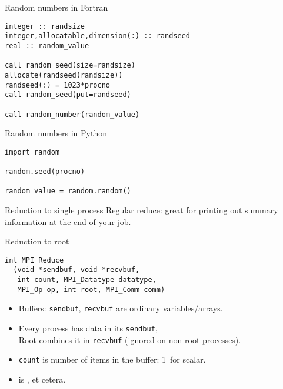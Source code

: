 \begin{numberedframe}{Random numbers in Fortran}
\lstset{language=Fortran}
\begin{lstlisting}
integer :: randsize
integer,allocatable,dimension(:) :: randseed
real :: random_value

call random_seed(size=randsize)
allocate(randseed(randsize))
randseed(:) = 1023*procno
call random_seed(put=randseed)

call random_number(random_value)
\end{lstlisting}
\end{numberedframe}

\begin{numberedframe}{Random numbers in Python}
\lstset{language=Python}
\begin{lstlisting}
import random

random.seed(procno)

random_value = random.random()
\end{lstlisting}
\end{numberedframe}

\begin{optexerciseframe}
  
\end{optexerciseframe}

\begin{numberedframe}{Reduction to single process}
    Regular reduce: great for printing out summary information at the
  end of your job.
\end{numberedframe}

\begin{numberedframe}{Reduction to root}
\lstset{language=C}
\begin{lstlisting}
int MPI_Reduce
  (void *sendbuf, void *recvbuf,
   int count, MPI_Datatype datatype, 
   MPI_Op op, int root, MPI_Comm comm)
\end{lstlisting}
\begin{itemize}
\item Buffers: \lstinline{sendbuf}, \lstinline{recvbuf} are ordinary variables/arrays.
\item Every process has data in its \lstinline{sendbuf},\\
  Root combines it in \lstinline{recvbuf} (ignored on non-root processes).
\item \lstinline{count} is number of items in the buffer: 1~for scalar.
\item {} is ,  et cetera.
\end{itemize}
\end{numberedframe}

